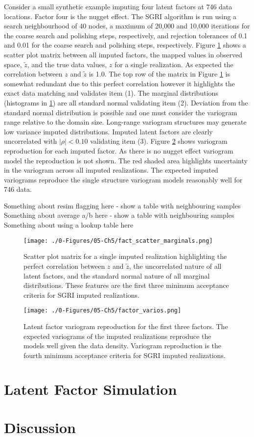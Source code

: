 Consider a small synthetic example imputing four latent factors at 746 data locations. Factor four is the nugget effect. The \gls{SGRI} algorithm is run using a search neighbourhood of 40 nodes, a maximum of 20,000 and 10,000 iterations for the coarse search and polishing steps, respectively, and rejection tolerances of 0.1 and 0.01 for the coarse search and polishing steps, respectively. Figure \ref{fig:fact_scatter_marginals} shows a scatter plot matrix between all imputed factors, the mapped values in observed space, $\tilde{z}$, and the true data values, $z$ for a single realization. As expected the correlation between $z$ and $\tilde{z}$ is 1.0. The top row of the matrix in Figure \ref{fig:fact_scatter_marginals} is somewhat redundant due to this perfect correlation however it highlights the exact data matching and validates item (1). The marginal distributions (histograms in \ref{fig:fact_scatter_marginals}) are all standard normal validating item (2). Deviation from the standard normal distribution is possible and one must consider the variogram range relative to the domain size. Long-range variogram structures may generate low variance imputed distributions. Imputed latent factors are clearly uncorrelated with $\lvert \rho \rvert < 0.10$ validating item (3). Figure \ref{fig:factor_varios} shows variogram reproduction for each imputed factor. As there is no nugget effect variogram model the reproduction is not shown. The red shaded area highlights uncertainty in the variogram across all imputed realizations. The expected imputed variograms reproduce the single structure variogram models reasonably well for 746 data.

Something about resim flagging here - show a table with neighbouring samples
Something about average a/b here - show a table with neighbouring samples
Something about using a lookup table here

\begin{figure}[htb!]
    \centering
    \texttt{[image: ./0-Figures/05-Ch5/fact\_scatter\_marginals.png]}
    \caption{Scatter plot matrix for a single imputed realization highlighting the perfect correlation between $z$ and $\tilde{z}$, the uncorrelated nature of all latent factors, and the standard normal nature of all marginal distributions. These features are the first three minimum acceptance criteria for \gls{SGRI} imputed realizations.}
    \label{fig:fact_scatter_marginals}
\end{figure}

\begin{figure}[htb!]
    \centering
    \texttt{[image: ./0-Figures/05-Ch5/factor\_varios.png]}
    \caption{Latent factor variogram reproduction for the first three factors. The expected variograms of the imputed realizations reproduce the models well given the data density. Variogram reproduction is the fourth minimum acceptance criteria for \gls{SGRI} imputed realizations.}
    \label{fig:factor_varios}
\end{figure}

\FloatBarrier
\section{Latent Factor Simulation}
\label{sec:latentsim}


\FloatBarrier
\section{Discussion}
\label{sec:discuss05}